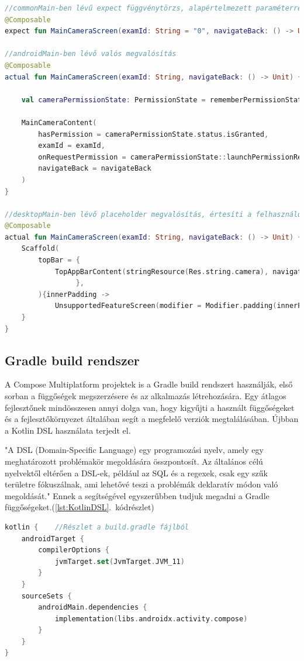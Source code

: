 \begin{lstlisting}[caption={Expect és actual használata}, label={lst:ExpectActual}, language=Kotlin]
//commonMain-ben lévű expect függvénytörzs, alapértelmezett paraméterrel.
@Composable
expect fun MainCameraScreen(examId: String = "0", navigateBack: () -> Unit)

//androidMain-ben lévő valós megvalósítás
@Composable
actual fun MainCameraScreen(examId: String, navigateBack: () -> Unit) {

    val cameraPermissionState: PermissionState = rememberPermissionState(android.Manifest.permission.CAMERA)

    MainCameraContent(
        hasPermission = cameraPermissionState.status.isGranted,
        examId = examId,
        onRequestPermission = cameraPermissionState::launchPermissionRequest,
        navigateBack = navigateBack
    )
}

//desktopMain-ben lévő placeholder megvalósítás, értesíti a felhasználót, hogy ez a funkció az eszközén nem támogatott
@Composable
actual fun MainCameraScreen(examId: String, navigateBack: () -> Unit) {
    Scaffold(
        topBar = {
            TopAppBarContent(stringResource(Res.string.camera), navigateBack)
                 },
        ){innerPadding ->
            UnsupportedFeatureScreen(modifier = Modifier.padding(innerPadding))
    }
}
\end{lstlisting}

\subsection{Gradle build rendszer}

A Compose Multiplatform projektek is a Gradle build rendszert használják, első sorban a függőségek megszerzésere és az alkalmazás létrehozására.
Egy átlagos fejlesztőnek mindösszesen annyi dolga van, hogy kigyűjti a használt függőségeket és a fejlesztőkörnyezet általában segít a megfelelő verziók megtalálásában.
Újbban a Kotlin DSL használata terjedt el.

"A DSL (Domain-Specific Language) egy programozási nyelv, amely egy meghatározott problémakör megoldására összpontosít. Az általános célú nyelvektől eltérően a DSL-ek, például az SQL és a regexek, csak egy szűk területre fókuszálnak, ami lehetővé teszi a problémák deklaratív módon való megoldását."\cite{KotlinDSL}
Ennek a segítségével egyszerűbben tudjuk megadni a Gradle függőségeket.(\ref{lst:KotlinDSL}.~kódrészlet)

\begin{lstlisting}[caption={Kotlin DSL}, label={lst:KotlinDSL}, language=Kotlin]
kotlin {    //Részlet a build.gradle fájlból
    androidTarget {
        compilerOptions {
            jvmTarget.set(JvmTarget.JVM_11)
        }
    }
    sourceSets {
        androidMain.dependencies {
            implementation(libs.androidx.activity.compose)
        }
    }
}
\end{lstlisting}


